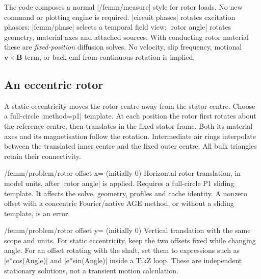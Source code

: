 
\begin{codeexample}[width=0pt]
\begin{tikzpicture}
\begin{axis}[width=6.3cm,height=4.8cm,font=\small,xmin=0,xmax=360,xtick={0,90,180,270,360},
    grid=major,xlabel={Excitation phase (degrees)},ylabel={$\delta T$ (mN\,m)},
    y filter/.expression={1000*y},scaled y ticks=false,title={Response around DC bias}]
  \femmforceplot[result=small-load,component=torque,
    plot options={orange!80!black,thick,mark=none}]
\end{axis}
\end{tikzpicture}
\end{codeexample}


The code composes a normal |/femm/measure| style for rotor loads. No new command
or plotting engine is required. |circuit phases| rotates excitation phasors;
|femm/phase| selects a temporal field view; |rotor angle| rotates geometry,
material axes and attached sources. With conducting rotor material these are
\emph{fixed-position} diffusion solves. No velocity, slip frequency, motional
$\mathbf v\times\mathbf B$ term, or back-emf from continuous rotation is implied.

\subsection{An eccentric rotor}
\label{sec:eccentric}
A static eccentricity moves the rotor centre away from the stator centre.
Choose a full-circle |method=p1| template. At each position the rotor first
rotates about the reference centre, then translates in the fixed stator frame.
Both its material axes and its magnetisation follow the rotation. Intermediate
air rings interpolate between the translated inner centre and the fixed outer
centre. All bulk triangles retain their connectivity.

\begin{key}{/femm/problem/rotor offset x= (initially 0)}
Horizontal rotor translation, in model units, after |rotor angle| is applied.
Requires a full-circle P1 sliding template. It affects the solve, geometry,
profiles and cache identity. A nonzero offset with a concentric Fourier/native
AGE method, or without a sliding template, is an error.
\end{key}
\begin{key}{/femm/problem/rotor offset y= (initially 0)}
Vertical translation with the same scope and units. For static eccentricity,
keep the two offsets fixed while changing angle. For an offset rotating with
the shaft, set them to expressions such as |e*cos(Angle)| and |e*sin(Angle)|
inside a TikZ loop. These are independent stationary solutions, not a transient
motion calculation.
\end{key}

